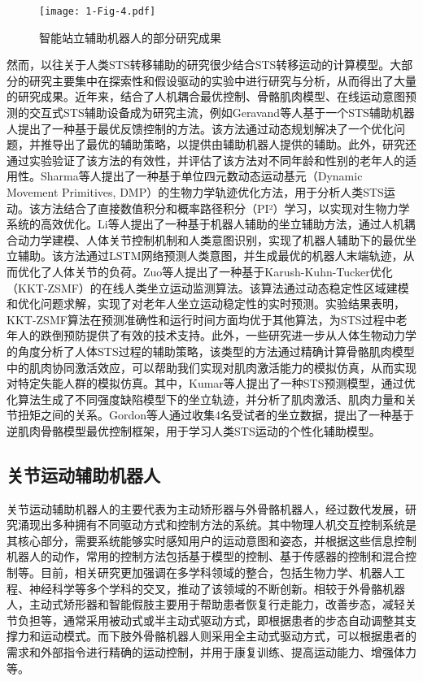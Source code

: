 \begin{figure}[h]
  \centering
  \texttt{[image: 1-Fig-4.pdf]}
  \caption{智能站立辅助机器人的部分研究成果}
  \label{fig:1-4}
\end{figure}

然而，以往关于人类STS转移辅助的研究很少结合STS转移运动的计算模型。大部分的研究主要集中在探索性和假设驱动的实验中进行研究与分析，从而得出了大量的研究成果。近年来，结合了人机耦合最优控制、骨骼肌肉模型、在线运动意图预测的交互式STS辅助设备成为研究主流，例如Geravand等人\cite{geravandHumanSittostandTransfer2017}基于一个STS辅助机器人提出了一种基于最优反馈控制的方法。该方法通过动态规划解决了一个优化问题，并推导出了最优的辅助策略，以提供由辅助机器人提供的辅助。此外，研究还通过实验验证了该方法的有效性，并评估了该方法对不同年龄和性别的老年人的适用性。Sharma等人\cite{sharmaBiomechanicalTrajectoryOptimization2022,sharmaPhysicalHumanRobotInteraction2022}提出了一种基于单位四元数动态运动基元（Dynamic Movement Primitives, DMP）的生物力学轨迹优化方法，用于分析人类STS运动。该方法结合了直接数值积分和概率路径积分（PI²）学习，以实现对生物力学系统的高效优化。Li等人\cite{liIntegratedApproachRobotic2021,liHumanCenteredControlFramework2018}提出了一种基于机器人辅助的坐立辅助方法，通过人机耦合动力学建模、人体关节控制机制和人类意图识别，实现了机器人辅助下的最优坐立辅助。该方法通过LSTM网络预测人类意图，并生成最优的机器人末端轨迹，从而优化了人体关节的负荷。Zuo等人\cite{zuoOnlineMonitoringHuman2023}提出了一种基于Karush-Kuhn-Tucker优化（KKT-ZSMF）的在线人类坐立运动监测算法。该算法通过动态稳定性区域建模和优化问题求解，实现了对老年人坐立运动稳定性的实时预测。实验结果表明，KKT-ZSMF算法在预测准确性和运行时间方面均优于其他算法，为STS过程中老年人的跌倒预防提供了有效的技术支持。此外，一些研究进一步从人体生物动力学的角度分析了人体STS过程的辅助策略，该类型的方法通过精确计算骨骼肌肉模型中的肌肉协同激活效应，可以帮助我们实现对肌肉激活能力的模拟仿真，从而实现对特定失能人群的模拟仿真。其中，Kumar等人\cite{kumarPredictingSittoStandAdaptations2022}提出了一种STS预测模型，通过优化算法生成了不同强度缺陷模型下的坐立轨迹，并分析了肌肉激活、肌肉力量和关节扭矩之间的关系。Gordon等人\cite{gordonLearningPersonalisedHuman2023a}通过收集4名受试者的坐立数据，提出了一种基于逆肌肉骨骼模型最优控制框架，用于学习人类STS运动的个性化辅助模型。

\subsection{关节运动辅助机器人}
关节运动辅助机器人的主要代表为主动矫形器与外骨骼机器人，经过数代发展，研究涌现出多种拥有不同驱动方式和控制方法的系统。其中物理人机交互控制系统是其核心部分，需要系统能够实时感知用户的运动意图和姿态，并根据这些信息控制机器人的动作，常用的控制方法包括基于模型的控制、基于传感器的控制和混合控制等。目前，相关研究更加强调在多学科领域的整合，包括生物力学、机器人工程、神经科学等多个学科的交叉，推动了该领域的不断创新。相较于外骨骼机器人，主动式矫形器和智能假肢主要用于帮助患者恢复行走能力，改善步态，减轻关节负担等，通常采用被动式或半主动式驱动方式，即根据患者的步态自动调整其支撑力和运动模式。而下肢外骨骼机器人则采用全主动式驱动方式，可以根据患者的需求和外部指令进行精确的运动控制，并用于康复训练、提高运动能力、增强体力等。

